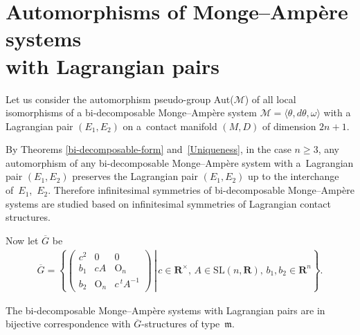 \section[Automorphisms of Monge-Amp{\`e}re systems with Lagrangian pairs]{Automorphisms of Monge--Amp{\`e}re systems\\ with Lagrangian pairs}
\label{Automorphisms}

Let us consider the automorphism pseudo-group Aut($\mathcal{M}$) of
all local isomorphisms of a bi-decomposable Monge--Amp{\`e}re system
$\mathcal{M} = \langle \theta, d\theta, \omega \rangle$
with a Lagrangian pair $(E_1,E_2)$
on a~contact manifold $(M,D)$ of dimension $2n+1$.

By Theorems \ref{bi-decomposable-form} and~\ref{Uniqueness}, in the case $n \geq 3$,
any automorphism of any bi-decomposable Monge--Amp{\`e}re system with a~Lagrangian pair $(E_1, E_2)$ preserves the Lagrangian pair $(E_1, E_2)$
up to the interchange of~$E_1$,~$E_2$.
Therefore inf\/initesimal symmetries
of bi-decom\-po\-sable Monge--Amp{\`e}re systems
are studied based on inf\/initesimal symmetries of Lagrangian contact structures.

Now let $\overline{G}$ be
\begin{gather*}
\overline{G} = \left\{\left. \begin{pmatrix}
                       c^2 & 0 & 0 \\
                        b_1 & cA &   \mathrm{O}_n \\
                        b_2 &   \mathrm{O}_n &   c\, {}^t\!\! A^{-1}
                    \end{pmatrix}
                    \, \right\vert \,
c \in {\mathbf{R}}^{\times}, \,A\in \mathrm{SL}(n,{\mathbf{R}}),\, b_1, b_2 \in {\mathbf{R}}^n
\right\}.
\end{gather*}

\begin{Prop}
The bi-decomposable Monge--Amp{\`e}re systems with Lagrangian pairs
are in bijective correspondence with $\overline{G}$-structures of type~$\mathfrak{m}$.
\end{Prop}


